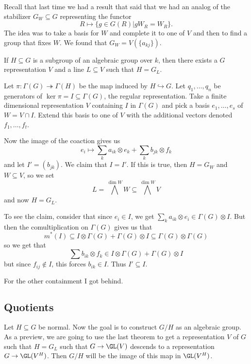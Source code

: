 \documentclass[12pt]{article}
\begin{document}
Recall that last time we had a result that said that we had an analog of the stabilizer $G_W\subseteq G$ 
representing the functor 
\[R\mapsto \{g\in G(R)|gW_R=W_R\}.\]
The idea was to take a basis for $W$ and complete it to one of $V$ and then to find a group that fixes $W$. We found 
that $G_W=V(\{a_{kj}\})$.
\begin{thm}[Chevalley]
	If $H\subseteq G$ is a subgroup of an algebraic group over $k$, then there exists a $G$ representation $V$ and a line $L\subseteq V$ such that $H=G_L$.
\end{thm}
\begin{prf}
	Let $\pi:\Gamma(G)\twoheadrightarrow\Gamma(H)$ be the map induced by $H\hookrightarrow G$. Let $q_1,\dots,q_n$ be
	generators of $\ker\pi=I\subseteq\Gamma(G)$, the regular representation. Take a finite dimensional representation $V$ containing $I$ in $\Gamma(G)$
	and pick a basis $e_1,\dots,e_s$ of $W=V\cap I$. Extend this basis to one of $V$ with the additional vectors denoted $f_1,\dots,f_t$.

	Now the image of the coaction gives us 
	\[e_i\mapsto\sum_k a_{ik}\otimes e_k+\sum_k b_{jk}\otimes f_k\]
	and let $I'=(b_{jk})$. We claim that $I=I'$. If this is true, then $H=G_W$ and $W\subseteq V$, so we set
	\[L=\bigwedge^{\dim W}W\subseteq \bigwedge^{\dim W}V\]
	and now $H= G_L$.

	To see the claim, consider that since $e_i\in I$, we get $\sum_ka_{ik}\otimes e_i\in \Gamma(G)\otimes I$.
	But then the comultiplication on $\Gamma(G)$ gives us that 
	\[m^\ast(I)\subseteq I\otimes \Gamma(G)+\Gamma(G)\otimes I\subseteq \Gamma(G)\otimes\Gamma(G)\]
	so we get that 
	\[\sum b_{ik}\otimes f_k\in I\otimes \Gamma(G)+\Gamma(G)\otimes I\]
	but since $f_{ij}\notin I$, this forces $b_{ik}\in I$. Thus $I'\subseteq I$.

	For the other containment I got behind.
\end{prf}
\subsection{Quotients}
Let $H\subseteq G$ be normal. Now the goal is to construct $G/H$ as an algebraic group. As a preview, we are going to use the last theorem 
to get a representation $V$ of $G$ such that $H=G_L$ such that $G\to \GL(V)$ descends to a representation $G\to \GL(V^H)$. Then $G/H$ will be the image of this map in $\GL(V^H)$.
\end{document}
